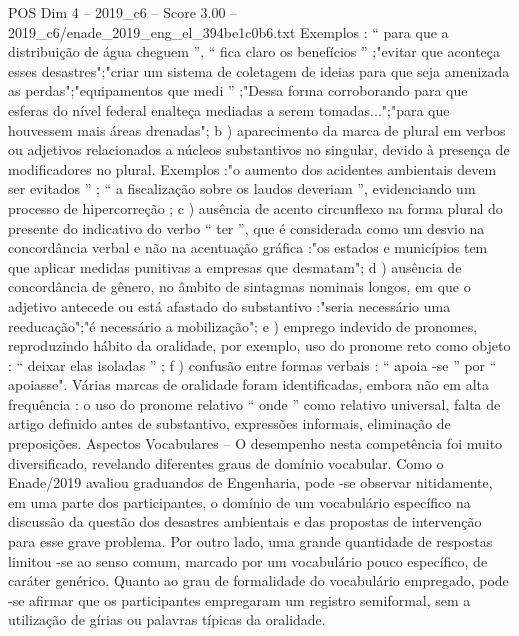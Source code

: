 \begin{textsample}{POS Dim 4 – 2019\_c6 – Score 3.00 – 2019\_c6/enade\_2019\_eng\_el\_394be1c0b6.txt}
Exemplos : “ para que a distribuição de água cheguem ”, “ fica claro os benefícios ” ;"evitar que aconteça esses desastres";"criar um sistema de coletagem de ideias para que seja amenizada as perdas";"equipamentos que medi ” ;"Dessa forma corroborando para que esferas do nível federal enalteça mediadas a serem tomadas...";"para que houvessem mais áreas drenadas"; b ) aparecimento da marca de plural em verbos ou adjetivos relacionados a núcleos substantivos no singular, devido à presença de modificadores no plural.
Exemplos :"o aumento dos acidentes ambientais devem ser evitados ” ; “ a fiscalização sobre os laudos deveriam ”, evidenciando um processo de hipercorreção ; c ) ausência de acento circunflexo na forma plural do presente do indicativo do verbo “ ter ”, que é considerada como um desvio na concordância verbal e não na acentuação gráfica :"os estados e municípios tem que aplicar medidas punitivas a empresas que desmatam"; d ) ausência de concordância de gênero, no âmbito de sintagmas nominais longos, em que o adjetivo antecede ou está afastado do substantivo :"seria necessário uma reeducação";"é necessário a mobilização"; e ) emprego indevido de pronomes, reproduzindo hábito da oralidade, por exemplo, uso do pronome reto como objeto : “ deixar elas isoladas ” ; f ) confusão entre formas verbais : “ apoia -se ” por “ apoiasse".
Várias marcas de oralidade foram identificadas, embora não em alta frequência : o uso do pronome relativo “ onde ” como relativo universal, falta de artigo definido antes de substantivo, expressões informais, eliminação de preposições.
Aspectos Vocabulares – O desempenho nesta competência foi muito diversificado, revelando diferentes graus de domínio vocabular.
Como o Enade/2019 avaliou graduandos de Engenharia, pode -se observar nitidamente, em uma parte dos participantes, o domínio de um vocabulário específico na discussão da questão dos desastres ambientais e das propostas de intervenção para esse grave problema.
Por outro lado, uma grande quantidade de respostas limitou -se ao senso comum, marcado por um vocabulário pouco específico, de caráter genérico.
Quanto ao grau de formalidade do vocabulário empregado, pode -se afirmar que os participantes empregaram um registro semiformal, sem a utilização de gírias ou palavras típicas da oralidade.

\end{textsample}
